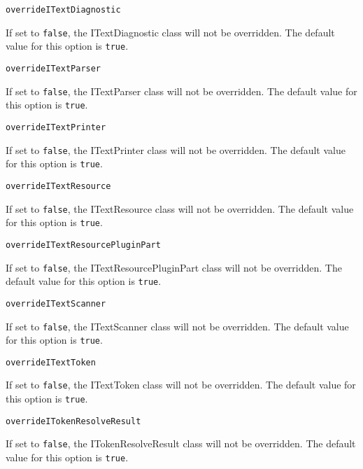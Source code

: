 \noindent\texttt{overrideITextDiagnostic}
\begin{myindentpar}{1cm}
If set to \texttt{false}, the ITextDiagnostic class will not be overridden. The default value for this option is \texttt{true}.
\end{myindentpar}

\noindent\texttt{overrideITextParser}
\begin{myindentpar}{1cm}
If set to \texttt{false}, the ITextParser class will not be overridden. The default value for this option is \texttt{true}.
\end{myindentpar}

\noindent\texttt{overrideITextPrinter}
\begin{myindentpar}{1cm}
If set to \texttt{false}, the ITextPrinter class will not be overridden. The default value for this option is \texttt{true}.
\end{myindentpar}

\noindent\texttt{overrideITextResource}
\begin{myindentpar}{1cm}
If set to \texttt{false}, the ITextResource class will not be overridden. The default value for this option is \texttt{true}.
\end{myindentpar}

\noindent\texttt{overrideITextResourcePluginPart}
\begin{myindentpar}{1cm}
If set to \texttt{false}, the ITextResourcePluginPart class will not be overridden. The default value for this option is \texttt{true}.
\end{myindentpar}

\noindent\texttt{overrideITextScanner}
\begin{myindentpar}{1cm}
If set to \texttt{false}, the ITextScanner class will not be overridden. The default value for this option is \texttt{true}.
\end{myindentpar}

\noindent\texttt{overrideITextToken}
\begin{myindentpar}{1cm}
If set to \texttt{false}, the ITextToken class will not be overridden. The default value for this option is \texttt{true}.
\end{myindentpar}

\noindent\texttt{overrideITokenResolveResult}
\begin{myindentpar}{1cm}
If set to \texttt{false}, the ITokenResolveResult class will not be overridden. The default value for this option is \texttt{true}.
\end{myindentpar}

